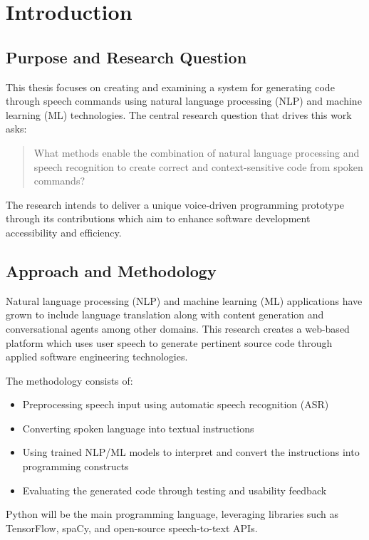 \chapter{Introduction} 

\section{Purpose and Research Question} 

This thesis focuses on creating and examining a system for generating code through speech commands using natural language processing (NLP) and machine learning (ML) technologies. The central research question that drives this work asks:

\begin{quote} 
What methods enable the combination of natural language processing and speech recognition to create correct and context-sensitive code from spoken commands?
\end{quote} 

The research intends to deliver a unique voice-driven programming prototype through its contributions which aim to enhance software development accessibility and efficiency.

\section{Approach and Methodology} 

Natural language processing (NLP) and machine learning (ML) applications have grown to include language translation along with content generation and conversational agents among other domains. This research creates a web-based platform which uses user speech to generate pertinent source code through applied software engineering technologies.


The methodology consists of:
\begin{itemize}
    \item Preprocessing speech input using automatic speech recognition (ASR)
    \item Converting spoken language into textual instructions
    \item Using trained NLP/ML models to interpret and convert the instructions into programming constructs
    \item Evaluating the generated code through testing and usability feedback
\end{itemize}

Python will be the main programming language, leveraging libraries such as TensorFlow, spaCy, and open-source speech-to-text APIs.

